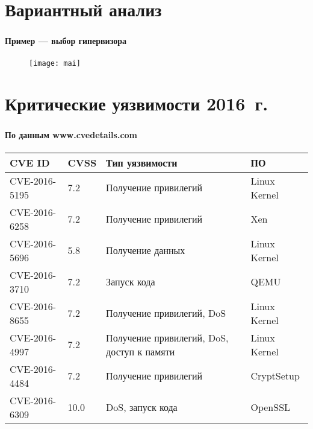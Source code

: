 
\section{Вариантный анализ}

\begin{frame}
\frametitle{\insertsection}
\framesubtitle{Пример --- выбор гипервизора}

\begin{figure}
    \center
    \texttt{[image: mai]}
\end{figure}
\end{frame}


\section{Критические уязвимости 2016~г.}

\begin{frame}
\frametitle{\insertsection}
\framesubtitle{По данным www.cvedetails.com}

\begin{table}
    \begin{tabular}{|l|l|p{4cm}|l|}
        \hline \textbf{CVE ID} & \textbf{CVSS} & \textbf{Тип уязвимости} & \textbf{ПО} \\
        \hline CVE-2016-5195 & 7.2 & Получение привилегий & Linux Kernel \\
        \hline CVE-2016-6258 & 7.2 & Получение привилегий & Xen \\
        \hline CVE-2016-5696 & 5.8 & Получение данных & Linux Kernel \\
        \hline CVE-2016-3710 & 7.2 & Запуск кода & QEMU \\
        \hline CVE-2016-8655 & 7.2 & Получение привилегий, DoS & Linux Kernel \\
        \hline CVE-2016-4997 & 7.2 & Получение привилегий, DoS, доступ к памяти & Linux Kernel \\
        \hline CVE-2016-4484 & 7.2 & Получение привилегий & CryptSetup \\
        \hline CVE-2016-6309 & 10.0 & DoS, запуск кода & OpenSSL\\
        \hline
    \end{tabular}
\end{table}
\end{frame}

